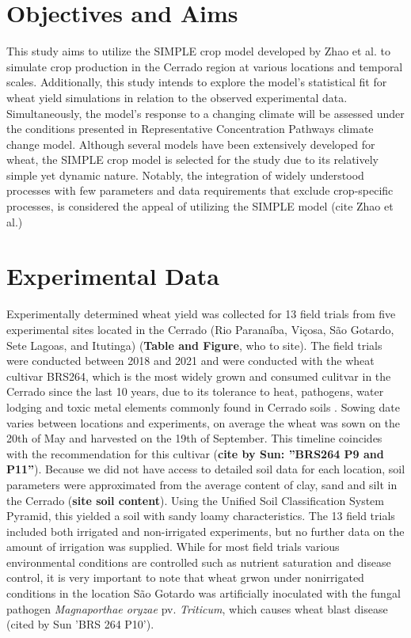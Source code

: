 \documentclass[11pt]{article}
\begin{document}
\section{Objectives and Aims}
\label{sec:orgdd57324}
This study aims to utilize the SIMPLE crop model developed by Zhao et al. to simulate crop production in the Cerrado region at various locations and temporal scales. Additionally, this study intends to explore the model’s statistical fit for wheat yield simulations in relation to the observed experimental data. Simultaneously, the model’s response to a changing climate will be assessed under the conditions presented in Representative Concentration Pathways climate change model. Although several models have been extensively developed for wheat, the SIMPLE crop model is selected for the study due to its relatively simple yet dynamic nature. Notably, the integration of widely understood processes with few parameters and data requirements that exclude crop-specific processes, is considered the appeal of utilizing the SIMPLE model (cite Zhao et al.)

\section{Experimental Data}
\label{sec:orgafe4a60}
Experimentally determined wheat yield was collected for 13 field trials from five experimental sites located in the Cerrado (Rio Paranaíba, Viçosa, São Gotardo, Sete Lagoas, and Itutinga) (\textbf{Table and Figure}, who to site). The field trials were conducted between 2018 and 2021 and were conducted with the wheat cultivar BRS264, which is the most widely grown and consumed culitvar in the Cerrado since the last 10 years, due to its tolerance to heat, pathogens, water lodging and toxic metal elements commonly found in Cerrado soils \cite{albrecht-2021-cultiv-trigo}.
Sowing date varies between locations and experiments, on average the wheat was sown on the 20th of May and harvested on the 19th of September. This timeline coincides with the recommendation for this cultivar (\textbf{cite by Sun: ''BRS264 P9 and P11''}). Because we did not have access to detailed soil data for each location, soil parameters were approximated from the average content of clay, sand and silt in the Cerrado (\textbf{site soil content}). Using the Unified Soil Classification System Pyramid, this yielded a soil with sandy loamy characteristics. The 13 field trials included both irrigated and non-irrigated experiments, but no further data on the amount of irrigation was supplied. While for most field trials various environmental conditions are controlled such as nutrient saturation and disease control, it is very important to note that wheat grwon under nonirrigated conditions in the location São Gotardo was artificially inoculated with the fungal pathogen \emph{Magnaporthae oryzae} pv. \emph{Triticum}, which causes wheat blast disease (cited by Sun 'BRS 264 P10').
\end{document}
